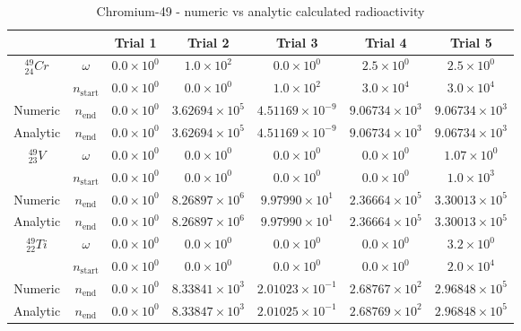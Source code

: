 \begin{table}[h]
\begin{center}
\begin{longtable}{c c c c c c c}
\hline\hline
 &  & Trial 1 & Trial 2 & Trial 3 & Trial 4 & Trial 5 \\
\hline\hline
${}^{49}_{24}Cr$ & $\omega$ & 
${0.0} \times 10^{0}$ & ${1.0} \times 10^{2}$ & ${0.0} \times 10^{0}$ &
${2.5} \times 10^{0}$ & ${2.5} \times 10^{0}$ \\
 & $n_{\text{start}}$ & 
${0.0} \times 10^{0}$ & ${0.0} \times 10^{0}$ & ${1.0} \times 10^{2}$ & 
${3.0} \times 10^{4}$ & ${3.0} \times 10^{4}$ \\
Numeric & $n_{\text{end}}$ & 
${0.0} \times 10^{0}$ & ${3.62694} \times 10^{5}$ & ${4.51169} \times 10^{-9}$ & 
${9.06734} \times 10^{3}$ & ${9.06734} \times 10^{3}$ \\
Analytic & $n_{\text{end}}$ & 
${0.0} \times 10^{0}$ & ${3.62694} \times 10^{5}$ & ${4.51169} \times 10^{-9}$ & 
${9.06734} \times 10^{3}$ & ${9.06734} \times 10^{3}$ \\
\hline
${}^{49}_{23}V$ & $\omega$ & 
${0.0} \times 10^{0}$ & ${0.0} \times 10^{0}$ & ${0.0} \times 10^{0}$ &
${0.0} \times 10^{0}$ & ${1.07} \times 10^{0}$ \\
 & $n_{\text{start}}$ & 
${0.0} \times 10^{0}$ & ${0.0} \times 10^{0}$ & ${0.0} \times 10^{0}$ &
${0.0} \times 10^{0}$ & ${1.0} \times 10^{3}$ \\
Numeric & $n_{\text{end}}$ & 
${0.0} \times 10^{0}$ & ${8.26897} \times 10^{6}$ & ${9.97990} \times 10^{1}$ & 
${2.36664} \times 10^{5}$ & ${3.30013} \times 10^{5}$ \\
Analytic & $n_{\text{end}}$ & 
${0.0} \times 10^{0}$ & ${8.26897} \times 10^{6}$ & ${9.97990} \times 10^{1}$ & 
${2.36664} \times 10^{5}$ & ${3.30013} \times 10^{5}$ \\
\hline
${}^{49}_{22}Ti$ & $\omega$ & 
${0.0} \times 10^{0}$ & ${0.0} \times 10^{0}$ & ${0.0} \times 10^{0}$ &
${0.0} \times 10^{0}$ & ${3.2} \times 10^{0}$ \\
 & $n_{\text{start}}$ & 
${0.0} \times 10^{0}$ & ${0.0} \times 10^{0}$ & ${0.0} \times 10^{0}$ &
${0.0} \times 10^{0}$ & ${2.0} \times 10^{4}$ \\
Numeric & $n_{\text{end}}$ & 
${0.0} \times 10^{0}$ & ${8.33841} \times 10^{3}$ & ${2.01023} \times 10^{-1}$ & 
${2.68767} \times 10^{2}$ & ${2.96848} \times 10^{5}$ \\
Analytic & $n_{\text{end}}$ & 
${0.0} \times 10^{0}$ & ${8.33847} \times 10^{3}$ & ${2.01025} \times 10^{-1}$ & 
${2.68769} \times 10^{2}$ & ${2.96848} \times 10^{5}$ \\
\hline\hline
\end{longtable}
\end{center}
\caption{Chromium-49 - numeric vs analytic calculated radioactivity}
\label{table:cr49trialdata}
\end{table}



